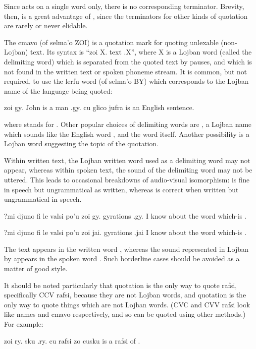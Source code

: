 Since  acts on a single word only, there is no
    corresponding terminator. Brevity, then, is a great advantage
    of , since the terminators for other kinds of quotation
    are rarely or never elidable.

The cmavo  (of selma'o ZOI) is a quotation mark for
    quoting unlexable (non-Lojban) text. Its syntax is ``zoi X.
    text .X'', where X is a Lojban word (called the delimiting
    word) which is separated from the quoted text by pauses, and
    which is not found in the written text or spoken phoneme
    stream. It is common, but not required, to use the lerfu word
    (of selma'o BY) which corresponds to the Lojban name of the
    language being quoted:
\begin{example}
zoi gy. John is a man .gy. cu glico jufra\n
{} is an English sentence.
\end{example}

{\noindent}where  stands for . Other popular choices of
    delimiting words are , a Lojban name which sounds
    like the English word , and the word  itself.
    Another possibility is a Lojban word suggesting the topic of
    the quotation. 

Within written text, the Lojban written word used as a
    delimiting word may not appear, whereas within spoken text, the
    sound of the delimiting word may not be uttered. This leads to
    occasional breakdowns of audio-visual isomorphism:  is fine in speech but
    ungrammatical as written, whereas  is correct when written but ungrammatical in
    speech.
\begin{example}
?mi djuno fi le valsi po'u zoi gy. gyrations .gy.\n
I know about the word which-is .
\end{example}

\begin{example}
?mi djuno fi le valsi po'u zoi jai. gyrations .jai\n
I know about the word which-is .
\end{example}

The text  appears in the written word ,
    whereas the sound represented in Lojban by  appears in
    the spoken word . Such borderline cases should be
    avoided as a matter of good style.

It should be noted particularly that  quotation is
    the only way to quote rafsi, specifically CCV rafsi, because
    they are not Lojban words, and  quotation is the only
    way to quote things which are not Lojban words. (CVC and CVV
    rafsi look like names and cmavo respectively, and so can be
    quoted using other methods.) For example:
\begin{example}
zoi ry. sku .ry. cu rafsi zo cusku\n
{} is a rafsi of .
\end{example}

